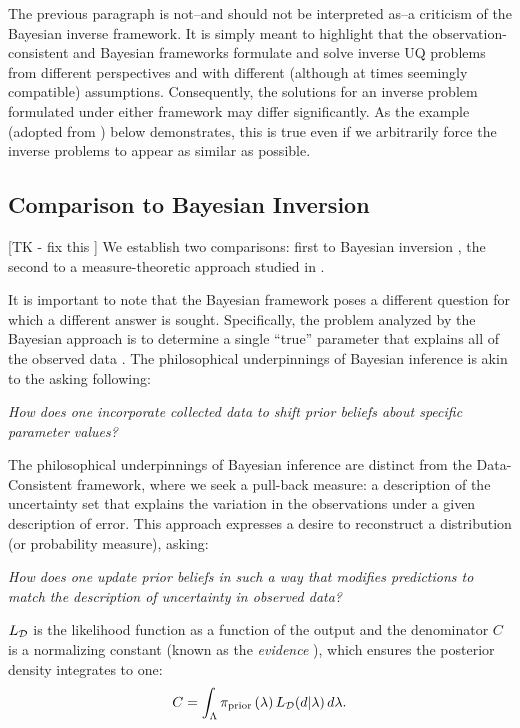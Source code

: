 The previous paragraph is not\---and should not be interpreted as\---a criticism of the Bayesian inverse framework.
It is simply meant to highlight that the observation-consistent and Bayesian frameworks formulate and solve inverse UQ problems from different perspectives and with different (although at times seemingly compatible) assumptions.
Consequently, the solutions for an inverse problem formulated under either framework may differ significantly.
As the example (adopted from \cite{BJW18a}) below demonstrates, this is true even if we arbitrarily force the inverse problems to appear as similar as possible.




\subsection{Comparison to Bayesian Inversion}\label{sec:bayesian}
[TK - fix this ] We establish two comparisons: first to Bayesian inversion \cite{Walpole, Berger, Complete, Smith}, the second to a measure-theoretic approach studied in \cite{BET+14, BE13}.

It is important to note that the Bayesian framework poses a different question for which a different answer is sought.
Specifically, the problem analyzed by the Bayesian approach is to determine a single ``true'' parameter that explains all of the observed data \cite{Smith, Concrete, Complete}.
The philosophical underpinnings of Bayesian inference is akin to the asking following:

\begin{center}
  \emph{How does one incorporate collected data to shift prior beliefs about specific parameter values?}
\end{center}

The philosophical underpinnings of Bayesian inference are distinct from the Data-Consistent framework, where we seek a pull-back measure: a description of the uncertainty set that explains the variation in the observations under a given description of error.
This approach expresses a desire to reconstruct a distribution (or probability measure), asking:

\begin{center}
  \emph{How does one update prior beliefs in such a way that modifies predictions to match the description of uncertainty in observed data?}
\end{center}


$L_{\mathcal{D}}$ is the likelihood function as a function of the output and the denominator $C$ is a normalizing constant (known as the \emph{evidence} \cite{Smith}), which ensures the posterior density integrates to one:
\[
C = \int_{\Lambda} \operatorname*{\pi_{prior}}\left ( \lambda \right ) L_{\mathcal{D}}(d | \lambda) \, d\lambda.
\]

